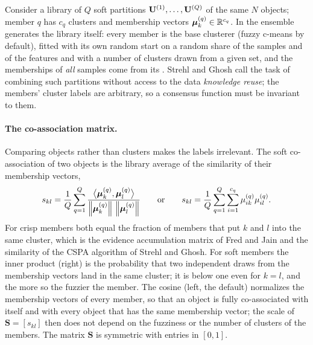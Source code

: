 Consider a library of $Q$ soft partitions $\mathbf{U}^{(1)},\dots,\mathbf{U}^{(Q)}$ of the same $N$ objects; member $q$ has $c_q$ clusters and membership vectors $\boldsymbol{\mu}^{(q)}_k\in\mathbb{R}^{c_q}$. In  the ensemble generates the library itself: every member is the base clusterer (fuzzy c-means by default), fitted with its own random start on a random share of the samples and of the features and with a number of clusters drawn from a given set, and the memberships of \emph{all} samples come from its . Strehl and Ghosh \cite{strehl:2002:ensembles} call the task of combining such partitions without access to the data \emph{knowledge reuse}; the members' cluster labels are arbitrary, so a consensus function must be invariant to them.

\paragraph{The co-association matrix.} Comparing objects rather than clusters makes the labels irrelevant. The soft co-association of two objects is the library average of the similarity of their membership vectors,
\begin{equation}
  s_{kl}=\frac{1}{Q}\sum_{q=1}^{Q}\frac{\big\langle\boldsymbol{\mu}^{(q)}_k,\boldsymbol{\mu}^{(q)}_l\big\rangle}{\left\lVert \boldsymbol{\mu}^{(q)}_k \right\rVert\,\left\lVert \boldsymbol{\mu}^{(q)}_l \right\rVert}
  \qquad\text{or}\qquad
  s_{kl}=\frac{1}{Q}\sum_{q=1}^{Q}\sum_{i=1}^{c_q}\mu^{(q)}_{ik}\mu^{(q)}_{il}.
  \label{eq:beyond:coassoc}
\end{equation}
For crisp members both equal the fraction of members that put $k$ and $l$ into the same cluster, which is the evidence accumulation matrix of Fred and Jain \cite{fred:2005:eac} and the similarity of the CSPA algorithm of Strehl and Ghosh. For soft members the inner product (right) is the probability that two independent draws from the membership vectors land in the same cluster; it is below one even for $k=l$, and the more so the fuzzier the member. The cosine (left, the default) normalizes the membership vectors of every member, so that an object is fully co-associated with itself and with every object that has the same membership vector; the scale of $\mathbf{S}=[s_{kl}]$ then does not depend on the fuzziness or the number of clusters of the members. The matrix $\mathbf{S}$ is symmetric with entries in $[0,1]$.

